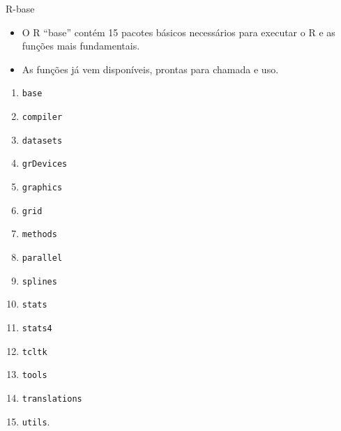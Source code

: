 \documentclass[
  ignorenonframetext,
  serif,
  professionalfont,
  usenames,
  dvipsnames,
  aspectratio = 169]{beamer}
\providecommand{\tightlist}{%
  \setlength{\itemsep}{0pt}\setlength{\parskip}{0pt}}
\renewcommand{\tightlist}{%
  \setlength{\itemsep}{0\baselineskip}
  \setlength{\parskip}{0.25\baselineskip}
}
\def\beginAHalfColumn{\begin{minipage}{0.49\textwidth}}%
\def\endColumns{\end{minipage}}%
\begin{document}
\begin{frame}[fragile]{R-base}
\label{r-base}
\begin{itemize}
\tightlist
\item
  O R ``base'' contém 15 pacotes básicos necessários para executar o R e
  as funções mais fundamentais.
\end{itemize}

\vspace{0.2cm}

\begin{itemize}
\tightlist
\item
  As funções já vem disponíveis, prontas para chamada e uso.
\end{itemize}

\vspace{0.2cm}

\beginAHalfColumn

\begin{enumerate}
\tightlist
\item
  \texttt{base}
\item
  \texttt{compiler}
\item
  \texttt{datasets}
\item
  \texttt{grDevices}
\item
  \texttt{graphics}
\item
  \texttt{grid}
\item
  \texttt{methods}
\item
  \texttt{parallel}
\end{enumerate}

\endColumns
\beginAHalfColumn

\begin{enumerate}
\setcounter{enumi}{8}
\tightlist
\item
  \texttt{splines}
\item
  \texttt{stats}
\item
  \texttt{stats4}
\item
  \texttt{tcltk}
\item
  \texttt{tools}
\item
  \texttt{translations}
\item
  \texttt{utils}.
\end{enumerate}

\endColumns
\end{frame}
\end{document}
